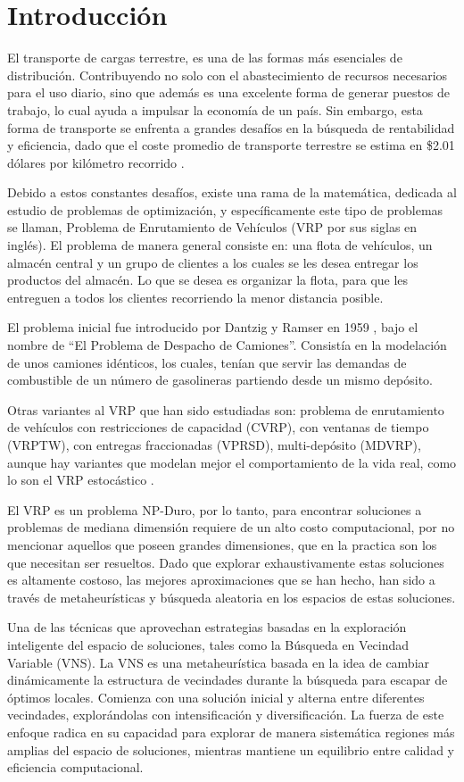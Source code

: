\documentclass{article}
\begin{document}
\section{Introducción}
El transporte de cargas terrestre, es una de las formas más esenciales de distribución. Contribuyendo no solo con el abastecimiento de recursos necesarios para el uso diario, sino que además es una excelente forma de generar puestos de trabajo, lo cual ayuda a impulsar la economía de un país. Sin embargo, esta forma de transporte se enfrenta a grandes desafíos en la búsqueda de rentabilidad y eficiencia, dado que el coste promedio de transporte terrestre se estima en \$2.01 dólares por kilómetro recorrido \cite{ref1}.


Debido a estos constantes desafíos, existe una rama de la matemática, dedicada al estudio de problemas de optimización, y específicamente este tipo de problemas se llaman, Problema de Enrutamiento de Vehículos (VRP por sus siglas en inglés). El problema de manera general consiste en: una flota de vehículos, un almacén central y un grupo de clientes a los cuales se les desea entregar los productos del almacén. Lo que se desea es organizar la flota, para que les entreguen a todos los clientes recorriendo la menor distancia posible. 

El problema inicial fue introducido por Dantzig y Ramser en 1959 \cite{ref18}, bajo el nombre de ``El Problema de Despacho de Camiones''. Consistía en la modelación de unos camiones idénticos, los cuales, tenían que servir las demandas de combustible de un número de gasolineras partiendo desde un mismo depósito.

Otras variantes al VRP que han sido estudiadas son: problema de enrutamiento de vehículos con restricciones de capacidad (CVRP), con ventanas de tiempo (VRPTW), con entregas fraccionadas (VPRSD), multi-depósito (MDVRP), aunque hay variantes que modelan mejor el comportamiento de la vida real, como lo son el VRP estocástico \cite{ref2}.


El VRP es un problema NP-Duro, por lo tanto, para encontrar soluciones a problemas de mediana dimensión requiere de un alto costo computacional, por no mencionar aquellos que poseen grandes dimensiones, que en la practica son los que necesitan ser resueltos. Dado que explorar exhaustivamente estas soluciones es altamente costoso, las mejores aproximaciones que se han hecho, han sido a través de metaheurísticas \cite{ref4} y búsqueda aleatoria en los espacios de estas soluciones.

Una de las técnicas que aprovechan estrategias basadas en la exploración inteligente del espacio de soluciones, tales como la Búsqueda en Vecindad Variable (VNS)\cite{ref17}. La VNS es una metaheurística basada en la idea de cambiar dinámicamente la estructura de vecindades durante la búsqueda para escapar de óptimos locales. Comienza con una solución inicial y alterna entre diferentes vecindades, explorándolas con intensificación y diversificación. La fuerza de este enfoque radica en su capacidad para explorar de manera sistemática regiones más amplias del espacio de soluciones, mientras mantiene un equilibrio entre calidad y eficiencia computacional.
\end{document}

